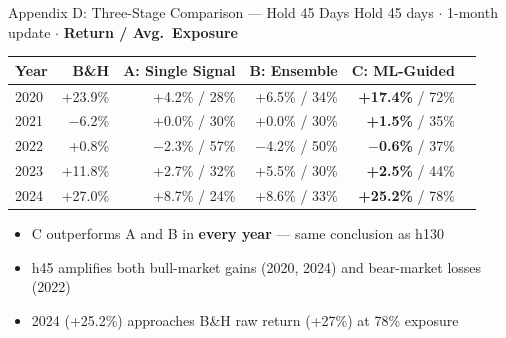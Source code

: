 \documentclass[aspectratio=169]{beamer}
\begin{document}
\begin{frame}{Appendix D: Three-Stage Comparison — Hold 45 Days}
  \small
  Hold 45 days $\cdot$ 1-month update $\cdot$ \textbf{Return / Avg.\ Exposure}

  \vspace{0.4em}
  \begin{tabular}{lrrrrr}
    \toprule
    Year & B\&H & A: Single Signal & B: Ensemble & C: ML-Guided \\
    \midrule
    2020 & +23.9\% & +4.2\% / 28\% & +6.5\% / 34\% & \textbf{+17.4\%} / 72\% \\
    2021 & $-$6.2\%  & +0.0\% / 30\% & +0.0\% / 30\% & \textbf{+1.5\%} / 35\% \\
    2022 & +0.8\%  & $-$2.3\% / 57\% & $-$4.2\% / 50\% & \textbf{$-$0.6\%} / 37\% \\
    2023 & +11.8\% & +2.7\% / 32\% & +5.5\% / 30\% & \textbf{+2.5\%} / 44\% \\
    2024 & +27.0\% & +8.7\% / 24\% & +8.6\% / 33\% & \textbf{+25.2\%} / 78\% \\
    \bottomrule
  \end{tabular}

  \vspace{0.5em}
  \begin{itemize}
    \item C outperforms A and B in \textbf{every year} — same conclusion as h130
    \item h45 amplifies both bull-market gains (2020, 2024) and bear-market losses (2022)
    \item 2024 (+25.2\%) approaches B\&H raw return (+27\%) at 78\% exposure
  \end{itemize}
\end{frame}
\end{document}
